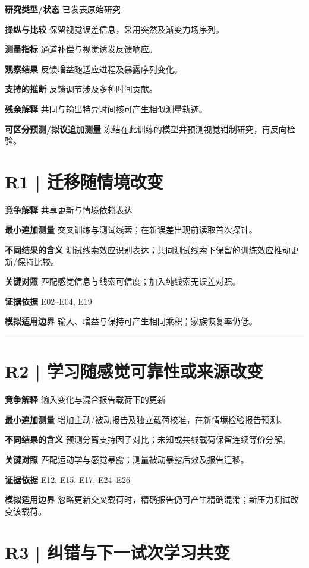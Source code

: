 \documentclass[11pt,a4paper]{article}
\begin{document}
\textbf{研究类型/状态} 已发表原始研究\par
\textbf{操纵与比较} 保留视觉误差信息，采用突然及渐变力场序列。\par
\textbf{测量指标} 通道补偿与视觉诱发反馈响应。\par
\textbf{观察结果} 反馈增益随适应进程及暴露序列变化。\par
\textbf{支持的推断} 反馈调节涉及多种时间贡献。\par
\textbf{残余解释} 共同与输出特异时间核可产生相似测量轨迹。\par
\textbf{可区分预测/拟议追加测量} 冻结在此训练的模型并预测视觉钳制研究，再反向检验。\par
\clearpage\section{R1 | 迁移随情境改变}
\medskip\textbf{竞争解释} 共享更新与情境依赖表达\par
\medskip\textbf{最小追加测量} 交叉训练与测试线索；在新误差出现前读取首次探针。\par
\medskip\textbf{不同结果的含义} 测试线索效应识别表达；共同测试线索下保留的训练效应推动更新/保持比较。\par
\medskip\textbf{关键对照} 匹配感觉信息与线索可信度；加入纯线索无误差对照。\par
\medskip\textbf{证据依据} E02--E04, E19\par
\medskip\textbf{模拟适用边界} 输入、增益与保持可产生相同乘积；家族恢复率仍低。\par
\bigskip\hrule\medskip\section{R2 | 学习随感觉可靠性或来源改变}
\medskip\textbf{竞争解释} 输入变化与混合报告载荷下的更新\par
\medskip\textbf{最小追加测量} 增加主动/被动报告及独立载荷校准，在新情境检验报告预测。\par
\medskip\textbf{不同结果的含义} 预测分离支持因子对比；未知或共线载荷保留连续等价分解。\par
\medskip\textbf{关键对照} 匹配运动学与感觉暴露；测量被动暴露后效及报告迁移。\par
\medskip\textbf{证据依据} E12, E15, E17, E24--E26\par
\medskip\textbf{模拟适用边界} 忽略更新交叉载荷时，精确报告仍可产生精确混淆；新压力测试改变该载荷。\par
\clearpage\section{R3 | 纠错与下一试次学习共变}
\end{document}
